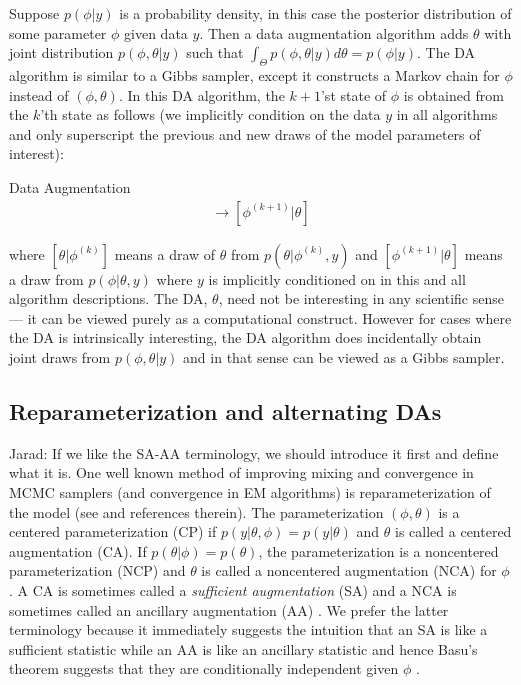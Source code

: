 \documentclass[12pt]{article}
\newcommand{\jarad}[1]{{\color{red} Jarad: #1}}
\begin{document}
Suppose $p(\phi|y)$ is a probability density, in this case the posterior distribution of some parameter $\phi$ given data $y$. %
Then a data augmentation algorithm adds $\theta$ with joint distribution $p(\phi,\theta|y)$ such that $\int_{\Theta}p(\phi,\theta|y)d\theta = p(\phi|y)$. The DA algorithm is similar to a Gibbs sampler, except it constructs a Markov chain for $\phi$ instead of $(\phi, \theta)$. In this DA algorithm, the $k+1$'st state of $\phi$ is obtained from the $k$'th state as follows (we implicitly condition on the data $y$ in all algorithms and only superscript the previous and new draws of the model parameters of interest):
\begin{alg*}[DA]Data Augmentation\label{alg:DA}
  \begin{align*}
  [\theta|\phi^{(k)}] \to [\phi^{(k+1)}|\theta]
\end{align*}
\end{alg*}
\noindent where $[\theta|\phi^{(k)}]$ means a draw of $\theta$ from $p(\theta|\phi^{(k)},y)$ and $[\phi^{(k+1)}|\theta]$ means a draw from $p(\phi|\theta,y)$ where $y$ is implicitly conditioned on in this and all algorithm descriptions. The DA, $\theta$, need not be interesting in any scientific sense --- it can be viewed purely as a computational construct. However for cases where the DA is intrinsically interesting, the DA algorithm does incidentally obtain joint draws from $p(\phi,\theta|y)$ and in that sense can be viewed as a Gibbs sampler. 

\subsection{Reparameterization and alternating DAs}

\jarad{If we like the SA-AA terminology, we should introduce it first and define what it is.}
One well known method of improving mixing and convergence in MCMC samplers (and convergence in EM algorithms) is reparameterization of the model (see  \citet{papaspiliopoulos2007general} and references therein). The parameterization $(\phi,\theta)$ is a centered parameterization (CP) if $p(y|\theta,\phi)=p(y|\theta)$ and $\theta$ is called a centered augmentation (CA). If $p(\theta|\phi)=p(\theta)$, the parameterization is a noncentered parameterization (NCP) and $\theta$ is called a noncentered augmentation (NCA) for $\phi$. A CA is sometimes called a {\it sufficient augmentation} (SA) and a NCA is sometimes called an ancillary augmentation (AA) \cite{yu2011center}. We prefer the latter terminology because it immediately suggests the intuition that an SA is like a sufficient statistic while an AA is like an ancillary statistic and hence Basu's theorem suggests that they are conditionally independent given $\phi$ \cite{basu1955statistics}.
\end{document}
